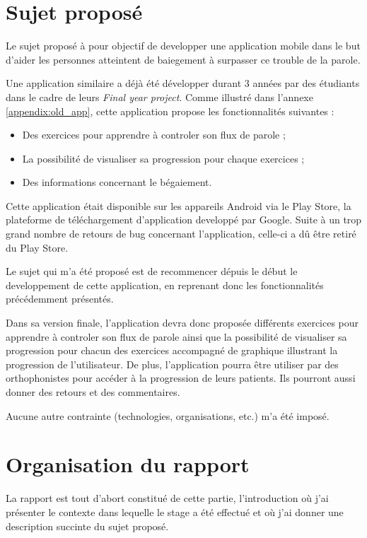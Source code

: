 \section{Sujet proposé}

Le sujet proposé à pour objectif de developper une application mobile dans le but d'aider les personnes atteintent de baiegement à surpasser ce trouble de la parole.

Une application similaire a déjà été développer durant 3 années par des étudiants dans le cadre de leurs \textit{Final year project}. Comme illustré dans l'annexe \ref{appendix:old_app}, cette application propose les fonctionnalités suivantes :

\begin{itemize}
  \item Des exercices pour apprendre à controler son flux de parole ;
  \item La possibilité de visualiser sa progression pour chaque exercices ;
  \item Des informations concernant le bégaiement.
\end{itemize}

Cette application était disponible sur les appareils Android via le Play Store, la plateforme de téléchargement d'application developpé par Google. Suite à un trop grand nombre de retours de bug concernant l'application, celle-ci a dû être retiré du Play Store.

Le sujet qui m'a été proposé est de recommencer dépuis le début le developpement de cette application, en reprenant donc les fonctionnalités précédemment présentés.

Dans sa version finale, l'application devra donc proposée différents exercices pour apprendre à controler son flux de parole ainsi que la possibilité de visualiser sa progression pour chacun des exercices accompagné de graphique illustrant la progression de l'utilisateur. De plus, l'application pourra être utiliser par des orthophonistes pour accéder à la progression de leurs patients. Ils pourront aussi donner des retours et des commentaires.

Aucune autre contrainte (technologies, organisations, etc.) m'a été imposé.


\section{Organisation du rapport}

La rapport est tout d'abort constitué de cette partie, l'introduction où j'ai présenter le contexte dans lequelle le stage a été effectué et où j'ai donner une description succinte du sujet proposé.

